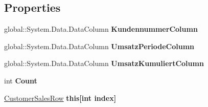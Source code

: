 \subsection*{Properties}
\begin{DoxyCompactItemize}
\item 
global\+::\+System.\+Data.\+Data\+Column {\bfseries Kundennummer\+Column}\hypertarget{class_products_1_1_data_1_1ds_sage_1_1_customer_sales_data_table_a95c62b14e9920023a2f9269819b438a6}{}\label{class_products_1_1_data_1_1ds_sage_1_1_customer_sales_data_table_a95c62b14e9920023a2f9269819b438a6}

\item 
global\+::\+System.\+Data.\+Data\+Column {\bfseries Umsatz\+Periode\+Column}\hypertarget{class_products_1_1_data_1_1ds_sage_1_1_customer_sales_data_table_a3004ddb5edfc3f9050bb28a3a762cbd7}{}\label{class_products_1_1_data_1_1ds_sage_1_1_customer_sales_data_table_a3004ddb5edfc3f9050bb28a3a762cbd7}

\item 
global\+::\+System.\+Data.\+Data\+Column {\bfseries Umsatz\+Kumuliert\+Column}\hypertarget{class_products_1_1_data_1_1ds_sage_1_1_customer_sales_data_table_a229c03503746f72fccfe281d53036b18}{}\label{class_products_1_1_data_1_1ds_sage_1_1_customer_sales_data_table_a229c03503746f72fccfe281d53036b18}

\item 
int {\bfseries Count}\hypertarget{class_products_1_1_data_1_1ds_sage_1_1_customer_sales_data_table_add6c8f943defc611d175b3a914680efe}{}\label{class_products_1_1_data_1_1ds_sage_1_1_customer_sales_data_table_add6c8f943defc611d175b3a914680efe}

\item 
\hyperlink{class_products_1_1_data_1_1ds_sage_1_1_customer_sales_row}{Customer\+Sales\+Row} {\bfseries this\mbox{[}int index\mbox{]}}\hypertarget{class_products_1_1_data_1_1ds_sage_1_1_customer_sales_data_table_a26d3f107f0d437a92cc8da5a3d3198db}{}\label{class_products_1_1_data_1_1ds_sage_1_1_customer_sales_data_table_a26d3f107f0d437a92cc8da5a3d3198db}

\end{DoxyCompactItemize}
